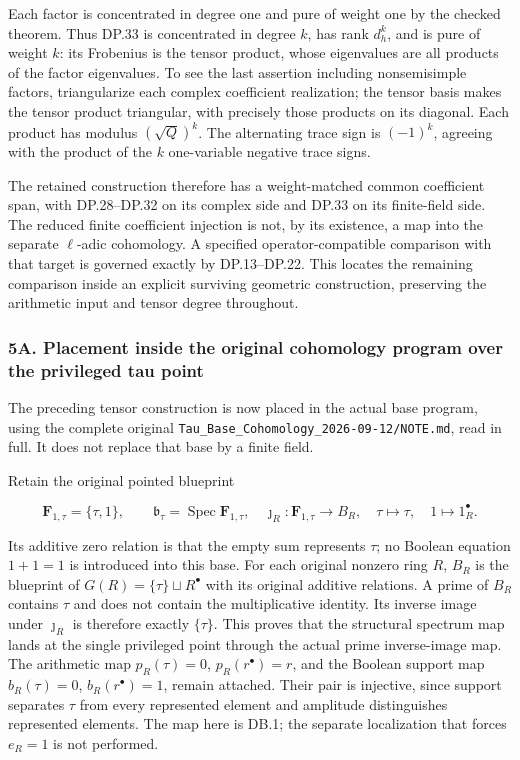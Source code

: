 \documentclass{article}
\begin{document}
Each factor is concentrated in degree one and pure of weight one by the checked theorem. Thus DP.33 is concentrated in degree \(k\), has rank \(d_h^k\), and is pure of weight \(k\): its Frobenius is the tensor product, whose eigenvalues are all products of the factor eigenvalues. To see the last assertion including nonsemisimple factors, triangularize each complex coefficient realization; the tensor basis makes the tensor product triangular, with precisely those products on its diagonal. Each product has modulus \((\sqrt Q)^k\). The alternating trace sign is \((-1)^k\), agreeing with the product of the \(k\) one-variable negative trace signs.

The retained construction therefore has a weight-matched common coefficient span, with DP.28--DP.32 on its complex side and DP.33 on its finite-field side. The reduced finite coefficient injection is not, by its existence, a map into the separate \(\ell\)-adic cohomology. A specified operator-compatible comparison with that target is governed exactly by DP.13--DP.22. This locates the remaining comparison inside an explicit surviving geometric construction, preserving the arithmetic input and tensor degree throughout.

\subsubsection{5A. Placement inside the original cohomology program over the privileged tau point}\label{endpoint-purity_review--a.-placement-inside-the-original-cohomology-program-over-the-privileged-tau-point}

The preceding tensor construction is now placed in the actual base program, using the complete original \nolinkurl{Tau_Base_Cohomology_2026-09-12/NOTE.md}, read in full. It does not replace that base by a finite field.

Retain the original pointed blueprint

\[
\mathbf F_{1,\tau}=\{\tau,1\},\qquad
\mathfrak b_\tau=\operatorname{Spec}\mathbf F_{1,\tau},
\quad \jmath_R:\mathbf F_{1,\tau}\to B_R,
\quad \tau\mapsto\tau,\quad1\mapsto1_R^\bullet.
\tag{DB.1}
\]

Its additive zero relation is that the empty sum represents \(\tau\); no Boolean equation \(1+1=1\) is introduced into this base. For each original nonzero ring \(R\), \(B_R\) is the blueprint of \(G(R)=\{\tau\}\sqcup R^\bullet\) with its original additive relations. A prime of \(B_R\) contains \(\tau\) and does not contain the multiplicative identity. Its inverse image under \(\jmath_R\) is therefore exactly \(\{\tau\}\). This proves that the structural spectrum map lands at the single privileged point through the actual prime inverse-image map. The arithmetic map \(p_R(\tau)=0\), \(p_R(r^\bullet)=r\), and the Boolean support map \(b_R(\tau)=0\), \(b_R(r^\bullet)=1\), remain attached. Their pair is injective, since support separates \(\tau\) from every represented element and amplitude distinguishes represented elements. The map here is DB.1; the separate localization that forces \(e_R=1\) is not performed.
\end{document}

